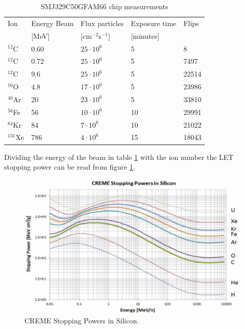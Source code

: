 \begin{table}[H]
\centering
\begin{tabular}{|l|l|l|l|l|}
\hline
Ion & Energy Beam & Flux particles & Exposure time & Flips \\
& [MeV] & [cm$^{-2}$s$^{-1}$] & [minutes] & \\\hline

$^{12}$C & 0.60 & $25 \cdot 10^6$ & 5 & 8\\\hline
$^{12}$C & 0.72 & $25 \cdot 10^6$ & 5 & 7497\\\hline
$^{12}$C & 9.6 & $25 \cdot 10^6$ & 5 & 22514\\\hline
$^{16}$O & 4.8 & $17 \cdot 10^6$ & 5 & 23986\\\hline
$^{40}$Ar & 20 & $23 \cdot 10^6$ & 5 & 33810\\\hline
$^{56}$Fe & 56 & $10 \cdot 10^6$ & 10 & 29991\\\hline
$^{84}$Kr & 84 & $7 \cdot 10^6$ & 10 & 21022\\\hline
$^{131}$Xe & 786 & $4 \cdot 10^6$ & 15 & 18043\\\hline

\end{tabular}
\caption{SMJ329C50GFAM66 chip measurements}
\label{tab:SMJ-LET}
\end{table}

Dividing the energy of the beam in table \ref{tab:SMJ-LET} with the ion number the LET stopping power can be read from figure \ref{fig:LET-stoppingpower}.

\begin{figure}[H]
\centering
\includegraphics[width=1\textwidth]{figures/stoppingPower.png}
\caption{CREME Stopping Powers in Silicon.}
\label{fig:LET-stoppingpower}
\end{figure}

